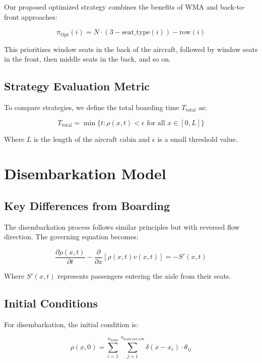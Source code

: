 \documentclass[a4paper,12pt]{article}
\begin{document}
Our proposed optimized strategy combines the benefits of WMA and back-to-front approaches:

\begin{equation}
\pi_{\text{Opt}}(i) = N \cdot (3 - \text{seat\_type}(i)) - \text{row}(i)
\end{equation}

This prioritizes window seats in the back of the aircraft, followed by window seats in the front, then middle seats in the back, and so on.

\subsection{Strategy Evaluation Metric}

To compare strategies, we define the total boarding time $T_{\text{total}}$ as:

\begin{equation}
T_{\text{total}} = \min\{t : \rho(x,t) < \epsilon \text{ for all } x \in [0, L]\}
\end{equation}

Where $L$ is the length of the aircraft cabin and $\epsilon$ is a small threshold value.

\section{Disembarkation Model}

\subsection{Key Differences from Boarding}

The disembarkation process follows similar principles but with reversed flow direction. The governing equation becomes:

\begin{equation}
\frac{\partial \rho(x,t)}{\partial t} - \frac{\partial}{\partial x}[\rho(x,t)v(x,t)] = -S'(x,t)
\end{equation}

Where $S'(x,t)$ represents passengers entering the aisle from their seats.

\subsection{Initial Conditions}

For disembarkation, the initial condition is:

\begin{equation}
\rho(x,0) = \sum_{i=1}^{n_{\text{rows}}} \sum_{j=1}^{n_{\text{seats per row}}} \delta(x - x_i) \cdot \theta_{ij}
\end{equation}
\end{document}
